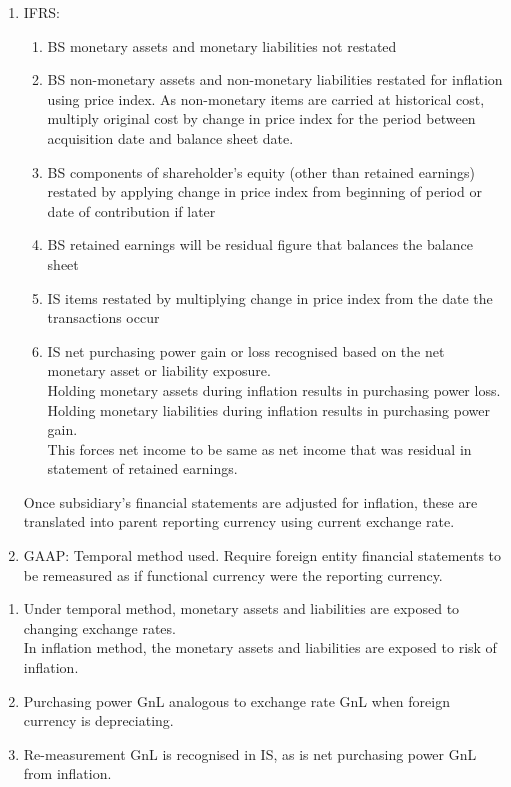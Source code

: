 \begin{method} 
\begin{enumerate}[label=\roman*.]
\setlength{\itemsep}{0pt}
\item IFRS:
\begin{enumerate}[label=\arabic*.]
\setlength{\itemsep}{0pt}
\item BS monetary assets and monetary liabilities not restated
\item BS non-monetary assets and non-monetary liabilities restated for inflation using price index. As non-monetary items are carried at historical cost, multiply original cost by change in price index for the period between acquisition date and balance sheet date.
\item BS components of shareholder's equity (other than retained earnings) restated by applying change in price index from beginning of period or date of contribution if later
\item BS retained earnings will be residual figure that balances the balance sheet
\item IS items restated by multiplying change in price index from the date the transactions occur
\item IS net purchasing power gain or loss recognised based on the net monetary asset or liability exposure.\\
Holding monetary assets during inflation results in purchasing power loss.\\
Holding monetary liabilities during inflation results in purchasing power gain.\\
This forces net income to be same as net income that was residual in statement of retained earnings.
\end{enumerate}
Once subsidiary's financial statements are adjusted for inflation, these are translated into parent reporting currency using current exchange rate.
\item GAAP: Temporal method used. Require foreign entity financial statements to be remeasured as if functional currency were the reporting currency.
\end{enumerate}
\end{method}

\begin{remark} 
\begin{enumerate}[label=\roman*.]
\setlength{\itemsep}{0pt}
\item Under temporal method, monetary assets and liabilities are exposed to changing exchange rates.\\
In inflation method, the monetary assets and liabilities are exposed to risk of inflation.
\item Purchasing power GnL analogous to exchange rate GnL when foreign currency is depreciating.
\item Re-measurement GnL is recognised in IS, as is net purchasing power GnL from inflation.
\end{enumerate}
\end{remark}

